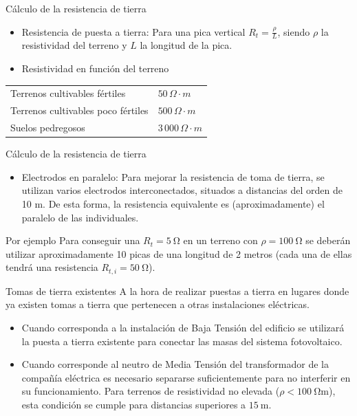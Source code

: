 \documentclass[xcolor={usenames,svgnames,dvipsnames}]{beamer}
\begin{document}
\begin{frame}[label=sec-3-0-4]{Cálculo de la resistencia de tierra}
\begin{itemize}
\item Resistencia de puesta a tierra: Para una pica vertical $R_{t}=\frac{\rho}{L}$, siendo $\rho$ la resistividad del terreno y $L$ la longitud de la pica.

\item Resistividad en función del terreno
\end{itemize}

\begin{center}
\begin{tabular}{ll}
Terrenos cultivables fértiles & $50\,\Omega\cdot m$\\
Terrenos cultivables poco fértiles & $500\,\Omega\cdot m$\\
Suelos pedregosos & $3\,000\,\Omega\cdot m$\\
\end{tabular}
\end{center}
\end{frame}

\begin{frame}[label=sec-3-0-5]{Cálculo de la resistencia de tierra}
\begin{itemize}
\item Electrodos en paralelo: Para mejorar la resistencia de toma de tierra, se utilizan varios electrodos interconectados, situados a distancias del orden de 10 m. De esta forma, \alert{la resistencia equivalente es (aproximadamente) el paralelo de las individuales}.
\end{itemize}

\begin{block}{Por ejemplo}
Para conseguir una $R_{t}=\SI{5}{\ohm}$ en un terreno con
$\rho=\SI{100}{\ohm}$ se deberán utilizar aproximadamente 10 picas de
una longitud de 2 metros (cada una de ellas tendrá una resistencia
$R_{t,i}=\SI{50}{\ohm}$).
\end{block}
\end{frame}

\begin{frame}[label=sec-3-0-6]{Tomas de tierra existentes}
A la hora de realizar puestas a tierra en lugares donde ya existen tomas
a tierra que pertenecen a otras instalaciones eléctricas.

\begin{itemize}
\item Cuando corresponda a la \alert{instalación de Baja Tensión del edificio}
\alert{se utilizará la puesta a tierra existente} para conectar las masas
del sistema fotovoltaico.

\item Cuando corresponde al \alert{neutro de Media Tensión del transformador de
la compañía eléctrica} es necesario \alert{separarse suficientemente} para
no interferir en su funcionamiento. Para terrenos de resistividad no
elevada ($\rho<\SI{100}{\ohm\meter}$), esta condición se cumple para
distancias superiores a $\SI{15}{\meter}$.
\end{itemize}
\end{frame}
\end{document}
